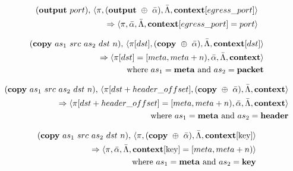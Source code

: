 \documentclass{article}
\begin{document}
\begin{equation}
\begin{split}
  (\textrm{\textbf{output}} \ port) \textrm{,} \ \langle \pi, (\textrm{\textbf{output}} \ \oplus \ \bar \alpha), \bar \Lambda,
  \textbf{\textrm{context}}[egress\_port] \rangle \\
  \Rightarrow 
  \langle \pi, \bar \alpha, \bar \Lambda,
  \textbf{\textrm{context}}[egress\_port] = port \rangle
\end{split}
\end{equation}

\begin{equation}
\begin{split}
  (\textrm{\textbf{copy}} \ as_1 \ src \ as_2 \ dst \ n)
  \textrm{,} \ \langle \pi[dst], (\textbf{\textrm{copy}} \ \oplus \ \bar \alpha), \bar \Lambda, \textrm{\textbf{context}}[dst] \rangle \\ \Rightarrow
  \langle \pi[dst] = [meta, meta + n), \bar \alpha, \bar \Lambda, \textrm{\textbf{context}} \rangle \\
    \textrm{where} \ as_1 = \textrm{\textbf{meta} and } as_2 =
    \textrm{\textbf{packet}}
\end{split}
\end{equation}

\begin{equation}
\begin{split}
  (\textrm{\textbf{copy}} \ as_1 \ src \ as_2 \ dst \ n)
  \textrm{,} \ \langle \pi[dst + header\_offset], (\textbf{\textrm{copy}} \ \oplus \ \bar \alpha), \bar \Lambda, \textrm{\textbf{context}} \rangle \\
  \Rightarrow
  \langle \pi[dst + header\_offset] = [meta, meta + n), \bar \alpha, \bar \Lambda, \textrm{\textbf{context}} \rangle \\
    \textrm{where} \ as_1 = \textrm{\textbf{meta} and } as_2 =
    \textrm{\textbf{header}}
\end{split}
\end{equation}

\begin{equation}
\begin{split}
  (\textrm{\textbf{copy}} \ as_1 \ src \ as_2 \ dst \ n)
  \textrm{,} \ \langle \pi, (\textrm{\textbf{copy}} \ \oplus \ \bar \alpha), \bar \Lambda, \textrm{\textbf{context}[key]} \rangle \\
  \Rightarrow
  \langle \pi, \bar \alpha, \bar \Lambda, \textrm{\textbf{context}[key]} = [meta, meta + n) \rangle \\
    \textrm{where} \ as_1 = \textrm{\textbf{meta} and } as_2 =
    \textrm{\textbf{key}}
\end{split}
\end{equation}
\end{document}
